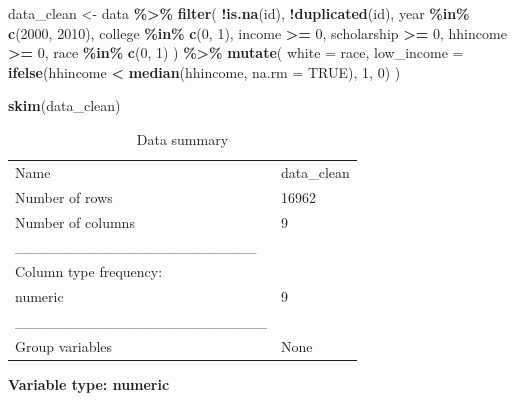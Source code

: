 \documentclass[
]{article}
\newenvironment{Shaded}{\begin{snugshade}}{\end{snugshade}}
\newcommand{\AttributeTok}[1]{\textcolor[rgb]{0.13,0.29,0.53}{#1}}
\newcommand{\ConstantTok}[1]{\textcolor[rgb]{0.56,0.35,0.01}{#1}}
\newcommand{\DecValTok}[1]{\textcolor[rgb]{0.00,0.00,0.81}{#1}}
\newcommand{\FunctionTok}[1]{\textcolor[rgb]{0.13,0.29,0.53}{\textbf{#1}}}
\newcommand{\NormalTok}[1]{#1}
\newcommand{\OtherTok}[1]{\textcolor[rgb]{0.56,0.35,0.01}{#1}}
\newcommand{\SpecialCharTok}[1]{\textcolor[rgb]{0.81,0.36,0.00}{\textbf{#1}}}
\begin{document}
\begin{Shaded}
\begin{Highlighting}[]
\NormalTok{data\_clean }\OtherTok{\textless{}{-}}\NormalTok{ data }\SpecialCharTok{\%\textgreater{}\%}
  \FunctionTok{filter}\NormalTok{(}
    \SpecialCharTok{!}\FunctionTok{is.na}\NormalTok{(id),}
    \SpecialCharTok{!}\FunctionTok{duplicated}\NormalTok{(id),}
\NormalTok{    year }\SpecialCharTok{\%in\%} \FunctionTok{c}\NormalTok{(}\DecValTok{2000}\NormalTok{, }\DecValTok{2010}\NormalTok{),}
\NormalTok{    college }\SpecialCharTok{\%in\%} \FunctionTok{c}\NormalTok{(}\DecValTok{0}\NormalTok{, }\DecValTok{1}\NormalTok{),}
\NormalTok{    income }\SpecialCharTok{\textgreater{}=} \DecValTok{0}\NormalTok{,}
\NormalTok{    scholarship }\SpecialCharTok{\textgreater{}=} \DecValTok{0}\NormalTok{,}
\NormalTok{    hhincome }\SpecialCharTok{\textgreater{}=} \DecValTok{0}\NormalTok{,}
\NormalTok{    race }\SpecialCharTok{\%in\%} \FunctionTok{c}\NormalTok{(}\DecValTok{0}\NormalTok{, }\DecValTok{1}\NormalTok{)}
\NormalTok{  ) }\SpecialCharTok{\%\textgreater{}\%}
  \FunctionTok{mutate}\NormalTok{(}
    \AttributeTok{white =}\NormalTok{ race,}
    \AttributeTok{low\_income =} \FunctionTok{ifelse}\NormalTok{(hhincome }\SpecialCharTok{\textless{}} \FunctionTok{median}\NormalTok{(hhincome, }\AttributeTok{na.rm =} \ConstantTok{TRUE}\NormalTok{), }\DecValTok{1}\NormalTok{, }\DecValTok{0}\NormalTok{)}
\NormalTok{  )}

\FunctionTok{skim}\NormalTok{(data\_clean)}
\end{Highlighting}
\end{Shaded}

\begin{longtable}[]{@{}ll@{}}
\caption{Data summary}\tabularnewline
\toprule\noalign{}
\endfirsthead
\endhead
\bottomrule\noalign{}
\endlastfoot
Name & data\_clean \\
Number of rows & 16962 \\
Number of columns & 9 \\
\_\_\_\_\_\_\_\_\_\_\_\_\_\_\_\_\_\_\_\_\_\_\_ & \\
Column type frequency: & \\
numeric & 9 \\
\_\_\_\_\_\_\_\_\_\_\_\_\_\_\_\_\_\_\_\_\_\_\_\_ & \\
Group variables & None \\
\end{longtable}

\textbf{Variable type: numeric}
\end{document}
